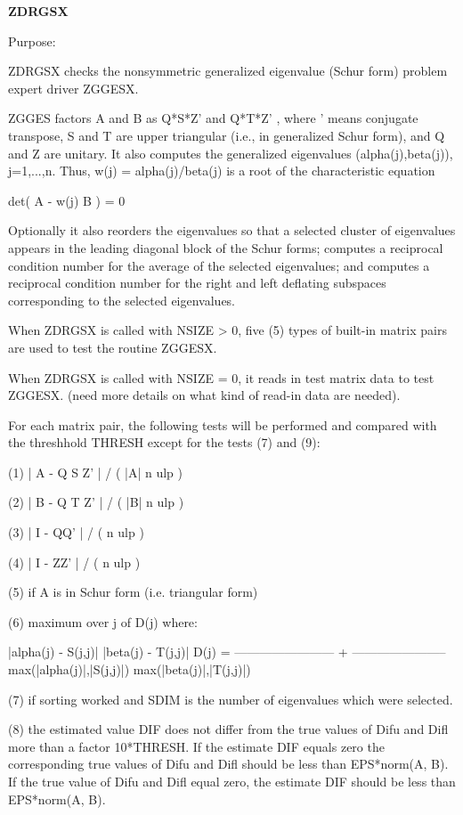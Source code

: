{\bfseries Z\+D\+R\+G\+S\+X} 

\begin{DoxyParagraph}{Purpose\+: }
\begin{DoxyVerb} ZDRGSX checks the nonsymmetric generalized eigenvalue (Schur form)
 problem expert driver ZGGESX.

 ZGGES factors A and B as Q*S*Z'  and Q*T*Z' , where ' means conjugate
 transpose, S and T are  upper triangular (i.e., in generalized Schur
 form), and Q and Z are unitary. It also computes the generalized
 eigenvalues (alpha(j),beta(j)), j=1,...,n.  Thus,
 w(j) = alpha(j)/beta(j) is a root of the characteristic equation

                 det( A - w(j) B ) = 0

 Optionally it also reorders the eigenvalues so that a selected
 cluster of eigenvalues appears in the leading diagonal block of the
 Schur forms; computes a reciprocal condition number for the average
 of the selected eigenvalues; and computes a reciprocal condition
 number for the right and left deflating subspaces corresponding to
 the selected eigenvalues.

 When ZDRGSX is called with NSIZE > 0, five (5) types of built-in
 matrix pairs are used to test the routine ZGGESX.

 When ZDRGSX is called with NSIZE = 0, it reads in test matrix data
 to test ZGGESX.
 (need more details on what kind of read-in data are needed).

 For each matrix pair, the following tests will be performed and
 compared with the threshhold THRESH except for the tests (7) and (9):

 (1)   | A - Q S Z' | / ( |A| n ulp )

 (2)   | B - Q T Z' | / ( |B| n ulp )

 (3)   | I - QQ' | / ( n ulp )

 (4)   | I - ZZ' | / ( n ulp )

 (5)   if A is in Schur form (i.e. triangular form)

 (6)   maximum over j of D(j)  where:

                     |alpha(j) - S(j,j)|        |beta(j) - T(j,j)|
           D(j) = ------------------------ + -----------------------
                  max(|alpha(j)|,|S(j,j)|)   max(|beta(j)|,|T(j,j)|)

 (7)   if sorting worked and SDIM is the number of eigenvalues
       which were selected.

 (8)   the estimated value DIF does not differ from the true values of
       Difu and Difl more than a factor 10*THRESH. If the estimate DIF
       equals zero the corresponding true values of Difu and Difl
       should be less than EPS*norm(A, B). If the true value of Difu
       and Difl equal zero, the estimate DIF should be less than
       EPS*norm(A, B).


\end{DoxyVerb}
\end{DoxyParagraph}
